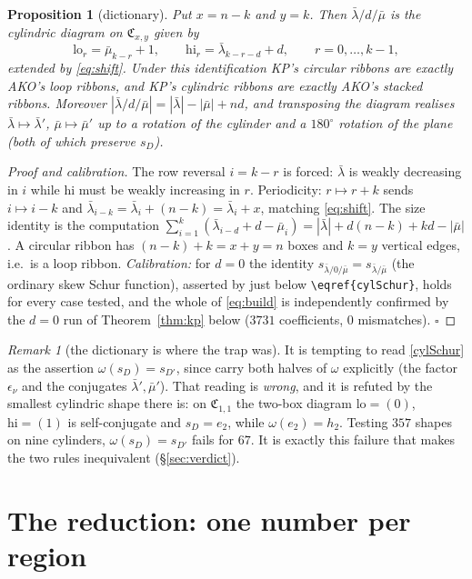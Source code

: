 \documentclass[11pt]{article}
\theoremstyle{plain}
\newtheorem{proposition}[theorem]{Proposition}
\theoremstyle{definition}
\theoremstyle{remark}
\newtheorem{remark}[theorem]{Remark}
\newcommand{\CC}{\mathfrak{C}}
\newcommand{\bl}{\bar\lambda}
\newcommand{\bm}{\bar\mu}
\begin{document}
\begin{proposition}[dictionary]\label{prop:dict}
Put $x=n-k$ and $y=k$. Then $\bl/d/\bm$ is the cylindric diagram on $\CC_{x,y}$ given by
\begin{equation}\label{eq:build}
  \mathrm{lo}_r=\bm_{k-r}+1,\qquad \mathrm{hi}_r=\bl_{k-r-d}+d,\qquad r=0,\dots,k-1,
\end{equation}
extended by \eqref{eq:shift}. Under this identification KP's circular ribbons are exactly AKO's loop
ribbons, and KP's cylindric ribbons are exactly AKO's stacked ribbons. Moreover
$|\bl/d/\bm|=|\bl|-|\bm|+nd$, and transposing the diagram realises $\bl\mapsto\bl'$,
$\bm\mapsto\bm'$ up to a rotation of the cylinder and a $180^\circ$ rotation of the plane (both of
which preserve $s_D$).
\end{proposition}

\begin{proof}[Proof and calibration]
The row reversal $i=k-r$ is forced: $\bl$ is weakly decreasing in $i$ while $\mathrm{hi}$ must be
weakly increasing in $r$. Periodicity: $r\mapsto r+k$ sends $i\mapsto i-k$ and
$\bl_{i-k}=\bl_i+(n-k)=\bl_i+x$, matching \eqref{eq:shift}. The size identity is the computation
$\sum_{i=1}^{k}(\bl_{i-d}+d-\bm_i)=|\bl|+d(n-k)+kd-|\bm|$. A circular ribbon has $(n-k)+k=x+y=n$
boxes and $k=y$ vertical edges, i.e.\ is a loop ribbon. \emph{Calibration:} for $d=0$ the identity
$s_{\bl/0/\bm}=s_{\bl/\bm}$ (the ordinary skew Schur function), asserted by \cite{KP} just below
\verb|\eqref{cylSchur}|, holds for every case tested, and the whole of \eqref{eq:build} is
independently confirmed by the $d=0$ run of Theorem~\ref{thm:kp} below ($3731$ coefficients, $0$
mismatches). $\square$
\end{proof}

\begin{remark}[the dictionary is where the trap was]
It is tempting to read \eqref{cylSchur} as the assertion $\omega(s_D)=s_{D'}$, since \cite{KP} carry
both halves of $\omega$ explicitly (the factor $\epsilon_\nu$ and the conjugates $\bl',\bm'$).
That reading is \emph{wrong}, and it is refuted by the smallest cylindric shape there is:
on $\CC_{1,1}$ the two-box diagram $\mathrm{lo}=(0)$, $\mathrm{hi}=(1)$ is self-conjugate and
$s_D=e_2$, while $\omega(e_2)=h_2$. Testing $357$ shapes on nine cylinders, $\omega(s_D)=s_{D'}$
fails for $67$. It is exactly this failure that makes the two rules inequivalent (\S\ref{sec:verdict}).
\end{remark}

\section{The reduction: one number per region}
\end{document}
